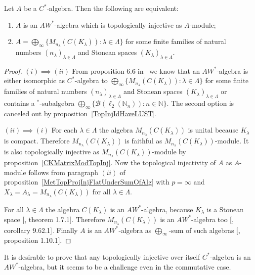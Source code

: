 \begin{theorem}\label{TopInjAWStarAlgCharac} Let $A$ be a $C^*$-algebra. Then
the following are equivalent:

\begin{enumerate}[label = (\roman*)]
    \item $A$ is an $AW^*$-algebra which is topologically injective 
    as $A$-module;

    \item $A
    =\bigoplus_\infty \{M_{n_\lambda}(C(K_\lambda)):\lambda\in\Lambda \}$
    for some finite families of natural 
    numbers ${(n_\lambda)}_{\lambda\in\Lambda}$ and Stonean 
    spaces ${(K_\lambda)}_{\lambda\in\Lambda}$.
\end{enumerate}
\end{theorem}
\begin{proof}$(i)\implies (ii)$ From proposition 6.6
in~\cite{SmithDecompPropCStarAlg} we know that an $AW^*$-algebra is either
isomorphic as $C^*$-algebra 
to  $\bigoplus_\infty \{M_{n_\lambda}(C(K_\lambda)):\lambda\in\Lambda \}$ 
for some finite families of natural numbers ${(n_\lambda)}_{\lambda\in\Lambda}$ 
and Stonean spaces ${(K_\lambda)}_{\lambda\in\Lambda}$ or contains 
a ${}^*$-subalgebra 
$\bigoplus_\infty \{ \mathcal{B}(\ell_2(\mathbb{N}_n)):n\in\mathbb{N} \}$. The
second option is canceled out by proposition~\ref{TopInjIdHaveLUST}.

$(ii)\implies (i)$ For each $\lambda\in\Lambda$ the algebra
$M_{n_\lambda}(C(K_\lambda))$ is unital because $K_\lambda$ is compact.
Therefore $M_{n_\lambda}(C(K_\lambda))$ is faithful as
$M_{n_\lambda}(C(K_\lambda))$-module. It is also topologically injective as
$M_{n_\lambda}(C(K_\lambda))$-module by proposition~\ref{CKMatrixModTopInj}.
Now the topological injectivity of $A$ as $A$-module follows from paragraph
$(ii)$ of proposition~\ref{MetTopProjInjFlatUnderSumOfAlg} with $p=\infty$ and
$X_\lambda=A_\lambda=M_{n_\lambda}(C(K_\lambda))$ for all $\lambda\in\Lambda$. 

For all $\lambda\in\Lambda$ the algebra $C(K_\lambda)$ is an $AW^*$-algebra,
because $K_\lambda$ is a Stonean space [\cite{BerbBaerStarRings}, theorem
1.7.1]. Therefore $M_{n_\lambda}(C(K_\lambda))$ is an $AW^*$-algebra too
[\cite{BerbBaerStarRings}, corollary 9.62.1]. Finally $A$ is an $AW^*$-algebra
as $\bigoplus_\infty$-sum of such algebras [\cite{BerbBaerStarRings},
proposition 1.10.1].
\end{proof}

It is desirable to prove that any topologically injective over itself
$C^*$-algebra is an $AW^*$-algebra, but it seems to be a challenge even in the
commutative case.

